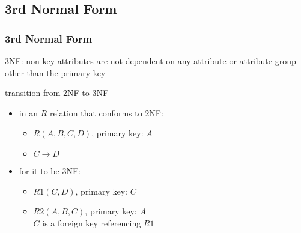\documentclass[dvipsnames]{beamer}
\begin{document}
\subsection{3rd Normal Form}

\begin{frame}
  \frametitle{3rd Normal Form}

  \begin{definition}
    \alert{3NF}: non-key attributes are not dependent on any attribute or
      attribute group other than the primary key
  \end{definition}

  \pause
  \begin{block}{transition from 2NF to 3NF}
    \begin{itemize}
      \item in an $R$ relation that conforms to 2NF:
      \begin{itemize}
        \item $R(A,B,C,D)$, primary key: $A$
        \item $C \rightarrow D$
      \end{itemize}

      \pause
      \item for it to be 3NF:
      \begin{itemize}
        \item $R1(C,D)$, primary key: $C$
        \item $R2(A,B,C)$, primary key: $A$\\
          $C$ is a foreign key referencing $R1$
      \end{itemize}
    \end{itemize}
 \end{block}
\end{frame}
\end{document}
